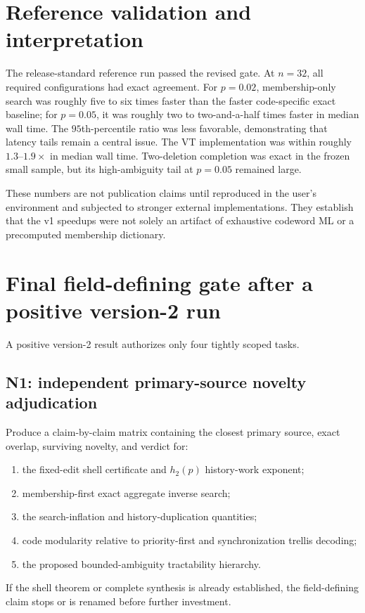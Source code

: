 \documentclass[11pt]{article}
\theoremstyle{definition}
\theoremstyle{remark}
\begin{document}
\section{Reference validation and interpretation}
The release-standard reference run passed the revised gate.  At $n=32$, all required configurations had exact agreement.  For $p=0.02$, membership-only search was roughly five to six times faster than the faster code-specific exact baseline; for $p=0.05$, it was roughly two to two-and-a-half times faster in median wall time.  The $95$th-percentile ratio was less favorable, demonstrating that latency tails remain a central issue.  The VT implementation was within roughly $1.3$--$1.9\times$ in median wall time.  Two-deletion completion was exact in the frozen small sample, but its high-ambiguity tail at $p=0.05$ remained large.

These numbers are not publication claims until reproduced in the user's environment and subjected to stronger external implementations.  They establish that the v1 speedups were not solely an artifact of exhaustive codeword ML or a precomputed membership dictionary.

\section{Final field-defining gate after a positive version-2 run}
A positive version-2 result authorizes only four tightly scoped tasks.

\subsection{N1: independent primary-source novelty adjudication}
Produce a claim-by-claim matrix containing the closest primary source, exact overlap, surviving novelty, and verdict for:
\begin{enumerate}[leftmargin=2em]
\item the fixed-edit shell certificate and $h_2(p)$ history-work exponent;
\item membership-first exact aggregate inverse search;
\item the search-inflation and history-duplication quantities;
\item code modularity relative to priority-first and synchronization trellis decoding;
\item the proposed bounded-ambiguity tractability hierarchy.
\end{enumerate}
If the shell theorem or complete synthesis is already established, the field-defining claim stops or is renamed before further investment.
\end{document}
